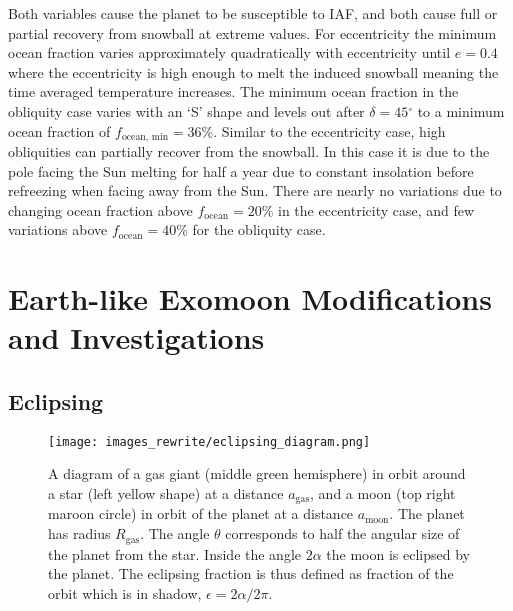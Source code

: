 \documentclass[12pt, onecolumn]{revtex4-2}    %
\newcommand{\degrees}{\ensuremath{^{\circ}}}
\begin{document}
Both variables cause the planet to be susceptible to IAF, and both cause full or partial recovery from snowball at extreme values.
For eccentricity the minimum ocean fraction varies approximately quadratically with eccentricity until $e = 0.4$ where the eccentricity is high enough to melt the induced snowball meaning the time averaged temperature increases.
The minimum ocean fraction in the obliquity case varies with an `S' shape and levels out after $\delta = 45\degrees$ to a minimum ocean fraction of $f_\text{ocean, min} = 36\%$.
Similar to the eccentricity case, high obliquities can partially recover from the snowball. In this case it is due to the pole facing the Sun melting for half a year due to constant insolation before refreezing when facing away from the Sun.
There are nearly no variations due to changing ocean fraction above $f_\text{ocean} = 20\%$ in the eccentricity case, and few variations above $f_\text{ocean} = 40\%$ for the obliquity case.

\section{Earth-like Exomoon Modifications and Investigations} \label{sec:Exomoons}
%
\subsection{Eclipsing} \label{ssec:eclipsing}
%
\begin{figure}[t]
  \texttt{[image: images\_rewrite/eclipsing\_diagram.png]}
  \caption{
    A diagram of a gas giant (middle green hemisphere) in orbit around a star (left yellow shape) at a distance $a_{\text{gas}}$, and a moon (top right maroon circle) in orbit of the planet at a distance $a_{\text{moon}}$.
    The planet has radius $R_\text{gas}$.
    The angle $\theta$ corresponds to half the angular size of the planet from the star.
    Inside the angle $2\alpha$ the moon is eclipsed by the planet.
    The eclipsing fraction is thus defined as fraction of the orbit which is in shadow, $\epsilon = 2\alpha / 2\pi$.
  }
  \label{fig:quantitative_eclipsing}
\end{figure}
\end{document}
